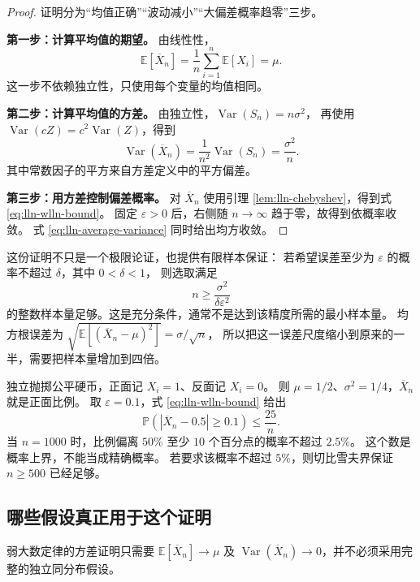 \documentclass[UTF8]{ctexart}
\begin{document}
\begin{proof}
证明分为“均值正确”“波动减小”“大偏差概率趋零”三步。

\textbf{第一步：计算平均值的期望。}
由线性性，
\[
  \mathbb E[\overline X_n]
  =\frac1n\sum_{i=1}^n\mathbb E[X_i]=\mu.
\]
这一步不依赖独立性，只使用每个变量的均值相同。

\textbf{第二步：计算平均值的方差。}
由独立性，$\operatorname{Var}(S_n)=n\sigma^2$，
再使用 $\operatorname{Var}(cZ)=c^2\operatorname{Var}(Z)$，得到
\begin{equation}
  \operatorname{Var}(\overline X_n)
  =\frac1{n^2}\operatorname{Var}(S_n)
  =\frac{\sigma^2}{n}.
  \label{eq:lln-average-variance}
\end{equation}
其中常数因子的平方来自方差定义中的平方偏差。

\textbf{第三步：用方差控制偏差概率。}
对 $\overline X_n$ 使用引理 \ref{lem:lln-chebyshev}，得到式 \eqref{eq:lln-wlln-bound}。
固定 $\varepsilon>0$ 后，右侧随 $n\to\infty$ 趋于零，故得到依概率收敛。
式 \eqref{eq:lln-average-variance} 同时给出均方收敛。
\end{proof}

这份证明不只是一个极限论证，也提供有限样本保证：
若希望误差至少为 $\varepsilon$ 的概率不超过 $\delta$，其中 $0<\delta<1$，
则选取满足
\begin{equation}
  n\geq\frac{\sigma^2}{\delta\varepsilon^2}
  \label{eq:lln-sample-size}
\end{equation}
的整数样本量足够。这是充分条件，通常不是达到该精度所需的最小样本量。
均方根误差为
$\sqrt{\mathbb E[(\overline X_n-\mu)^2]}=\sigma/\sqrt n$，
所以把这一误差尺度缩小到原来的一半，需要把样本量增加到四倍。

\begin{example}[公平硬币的正面比例]
\label{ex:lln-coin-bound}
独立抛掷公平硬币，正面记 $X_i=1$、反面记 $X_i=0$。
则 $\mu=1/2$、$\sigma^2=1/4$，$\overline X_n$ 就是正面比例。
取 $\varepsilon=0.1$，式 \eqref{eq:lln-wlln-bound} 给出
\[
  \mathbb P(|\overline X_n-0.5|\geq0.1)\leq\frac{25}{n}.
\]
当 $n=1000$ 时，比例偏离 $50\%$ 至少 $10$ 个百分点的概率不超过 $2.5\%$。
这个数是概率上界，不能当成精确概率。
若要求该概率不超过 $5\%$，则切比雪夫界保证 $n\geq500$ 已经足够。
\end{example}

\subsection{哪些假设真正用于这个证明}

弱大数定律的方差证明只需要
$\mathbb E[\overline X_n]\to\mu$ 及
$\operatorname{Var}(\overline X_n)\to0$，并不必须采用完整的独立同分布假设。
\end{document}
